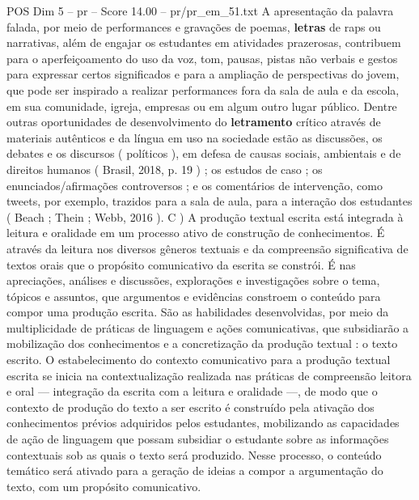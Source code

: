 \begin{textsample}{POS Dim 5 – pr – Score 14.00 – pr/pr\_em\_51.txt}
A apresentação da palavra falada, por meio de performances e gravações de poemas, \textbf{letras} de raps ou narrativas, além de engajar os estudantes em atividades prazerosas, contribuem para o aperfeiçoamento do uso da voz, tom, pausas, pistas não verbais e gestos para expressar certos significados e para a ampliação de perspectivas do jovem, que pode ser inspirado a realizar performances fora da sala de aula e da escola, em sua comunidade, igreja, empresas ou em algum outro lugar público.
Dentre outras oportunidades de desenvolvimento do \textbf{letramento} crítico através de materiais autênticos e da língua em uso na sociedade estão as discussões, os debates e os discursos ( políticos ), em defesa de causas sociais, ambientais e de direitos humanos ( Brasil, 2018, p. 19 ) ; os estudos de caso ; os enunciados/afirmações controversos ; e os comentários de intervenção, como tweets, por exemplo, trazidos para a sala de aula, para a interação dos estudantes ( Beach ; Thein ; Webb, 2016 ).
C ) A produção textual escrita está integrada à leitura e oralidade em um processo ativo de construção de conhecimentos.
É através da leitura nos diversos gêneros textuais e da compreensão significativa de textos orais que o propósito comunicativo da escrita se constrói.
É nas apreciações, análises e discussões, explorações e investigações sobre o tema, tópicos e assuntos, que argumentos e evidências constroem o conteúdo para compor uma produção escrita.
São as habilidades desenvolvidas, por meio da multiplicidade de práticas de linguagem e ações comunicativas, que subsidiarão a mobilização dos conhecimentos e a concretização da produção textual : o texto escrito.
O estabelecimento do contexto comunicativo para a produção textual escrita se inicia na contextualização realizada nas práticas de compreensão leitora e oral — integração da escrita com a leitura e oralidade —, de modo que o contexto de produção do texto a ser escrito é construído pela ativação dos conhecimentos prévios adquiridos pelos estudantes, mobilizando as capacidades de ação de linguagem que possam subsidiar o estudante sobre as informações contextuais sob as quais o texto será produzido.
Nesse processo, o conteúdo temático será ativado para a geração de ideias a compor a argumentação do texto, com um propósito comunicativo.

\end{textsample}
